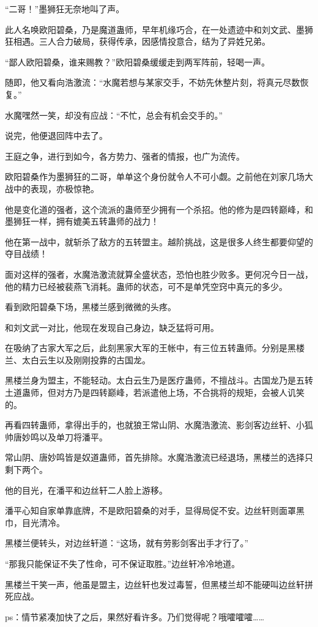 \begin{this_body}
“二哥！”墨狮狂无奈地叫了声。

此人名唤欧阳碧桑，乃是魔道蛊师，早年机缘巧合，在一处遗迹中和刘文武、墨狮狂相遇。三人合力破局，获得传承，因感情投意合，结为了异姓兄弟。

“鄙人欧阳碧桑，谁来赐教？”欧阳碧桑缓缓走到两军阵前，轻喝一声。

随即，他又看向浩激流：“水魔若想与某家交手，不妨先休整片刻，将真元尽数恢复。”

水魔嘿然一笑，却没有应战：“不忙，总会有机会交手的。”

说完，他便退回阵中去了。

王庭之争，进行到如今，各方势力、强者的情报，也广为流传。

欧阳碧桑作为墨狮狂的二哥，单单这个身份就令人不可小觑。之前他在刘家几场大战中的表现，亦极惊艳。

他是变化道的强者，这个流派的蛊师至少拥有一个杀招。他的修为是四转巅峰，和墨狮狂一样，拥有媲美五转蛊师的战力！

他在第一战中，就斩杀了敌方的五转盟主。越阶挑战，这是很多人终生都要仰望的夺目战绩！

面对这样的强者，水魔浩激流就算全盛状态，恐怕也胜少败多。更何况今日一战，他的精力已经被裴燕飞消耗。蛊师的状态，可不是单凭空窍中真元的多少。

看到欧阳碧桑下场，黑楼兰感到微微的头疼。

和刘文武一对比，他现在发现自己身边，缺乏猛将可用。

在吸纳了古家大军之后，此刻黑家大军的王帐中，有三位五转蛊师。分别是黑楼兰、太白云生以及刚刚投靠的古国龙。

黑楼兰身为盟主，不能轻动。太白云生乃是医疗蛊师，不擅战斗。古国龙乃是五转土道蛊师，但对方乃是四转巅峰，若派遣他上场，不合挑将的规矩，会被人讥笑的。

再看四转蛊师，拿得出手的，也就狼王常山阴、水魔浩激流、影剑客边丝轩、小狐帅唐妙鸣以及单刀将潘平。

常山阴、唐妙鸣皆是奴道蛊师，首先排除。水魔浩激流已经退场，黑楼兰的选择只剩下两个。

他的目光，在潘平和边丝轩二人脸上游移。

潘平心知自家单靠底牌，不是欧阳碧桑的对手，显得局促不安。边丝轩则面罩黑巾，目光清冷。

黑楼兰便转头，对边丝轩道：“这场，就有劳影剑客出手才行了。”

“那我只能保证不失了性命，可不保证取胜。”边丝轩冷冷地道。

黑楼兰干笑一声，他虽是盟主，边丝轩也发过毒誓，但黑楼兰却不能硬叫边丝轩拼死应战。

ps：情节紧凑加快了之后，果然好看许多。乃们觉得呢？哦嚯嚯嚯……

\end{this_body}

